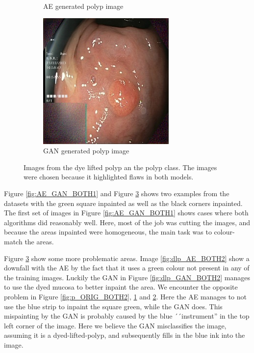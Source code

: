 \begin{figure}[h]
\begin{subfigure}[t]{\myfigsizethree}
            \caption{AE generated polyp image}    
            \label{fig:p_AE_BOTH2}
        \end{subfigure}
        \qquad%
        \begin{subfigure}[t]{\myfigsizethree}   
            \centering 
            \includegraphics[width=\textwidth]{experiments/figures/both/greenGAN.jpg}
            \caption{GAN generated polyp image}    
            \label{fig:p_GAN_BOTH2}
        \end{subfigure}
        \caption{Images from the dye lifted polyp an the polyp class. The images were chosen because it highlighted flaws in both models. } 
        \label{fig:AE_GAN_BOTH2}
    \end{figure}

Figure \ref{fig:AE_GAN_BOTH1} and Figure \ref{fig:AE_GAN_BOTH2} shows two examples from the datasets with the green square inpainted as well as the black corners inpainted.
The first set of images in Figure \ref{fig:AE_GAN_BOTH1} shows cases where both algorithms did reasonably well. Here, most of the job was cutting the images, and because the areas inpainted were homogeneous, the main task was to colour-match the areas.

Figure \ref{fig:AE_GAN_BOTH2} show some more problematic areas. Image \ref{fig:dlp_AE_BOTH2} show a downfall with the AE by the fact that it uses a green colour not present in any of the training images. Luckily the GAN in Figure \ref{fig:dlp_GAN_BOTH2} manages to use the dyed mucosa to better inpaint the area.
We encounter the opposite problem in Figure \ref{fig:p_ORIG_BOTH2}, \ref{fig:p_AE_BOTH2} and \ref{fig:p_GAN_BOTH2}. Here the AE manages to not use the blue strip to inpaint the square green, while the GAN does. 
This mispainting by the GAN is probably caused by the blue ´´instrument'' in the top left corner of the image. Here we believe the GAN misclassifies the image, assuming it is a dyed-lifted-polyp, and subsequently fills in the blue ink into the image.


